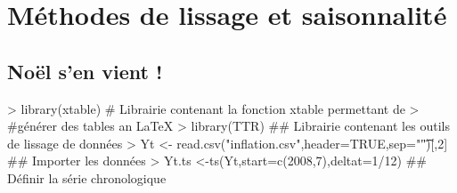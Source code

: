 \documentclass{article}
\begin{document}




\section{Méthodes de lissage et saisonnalité}
\label{sec:serie-dexercices-1}

\subsection{Noël s'en vient !}
\label{sec:exercice-1-1}

\begin{Schunk}
\begin{Sinput}
> library(xtable) # Librairie contenant la fonction xtable permettant de 
>                                         #générer des tables an LaTeX
> library(TTR) ## Librairie contenant les outils de lissage de données
> Yt <- read.csv("inflation.csv",header=TRUE,sep="\t")[,2] ## Importer les données
> Yt.ts <-ts(Yt,start=c(2008,7),deltat=1/12) ## Définir la série chronologique
\end{Sinput}
\end{Schunk}
\end{document}
